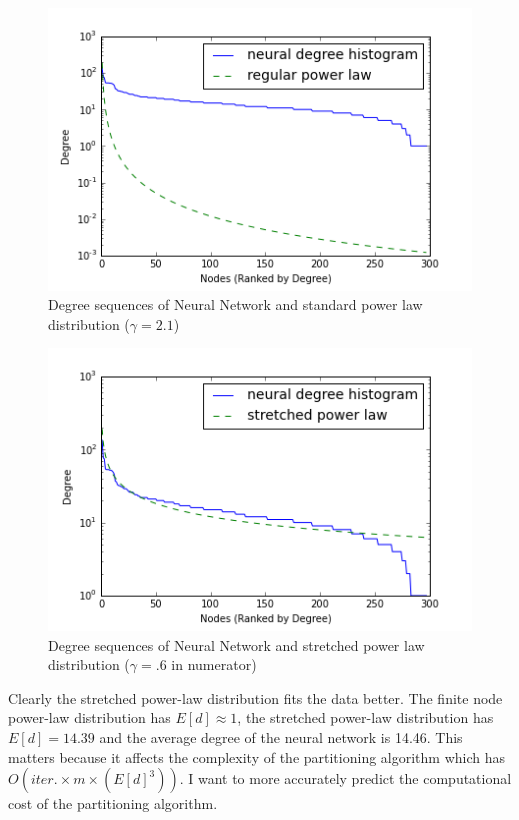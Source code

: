 \documentclass{article}
\begin{document}
\begin{figure}[H]
\centering
\includegraphics[width = \linewidth]{neuralsequenceplot2.png}
\caption{Degree sequences of Neural Network and standard power law distribution ($\gamma = 2.1$)}
\end{figure}

\begin{figure}[H]
\centering
\includegraphics[width = \linewidth]{neuralsequenceplot.png}
\caption{Degree sequences of Neural Network and stretched power law distribution ($\gamma = .6$ in numerator)}
\end{figure}

Clearly the stretched power-law distribution fits the data better. The finite node power-law distribution has $E[d] \approx 1$, the stretched power-law distribution has $E[d] = 14.39$ and the average degree of the neural network is 14.46. This matters because it affects the complexity of the partitioning algorithm which has $O(iter.\times m\times (E[d]^3))$. I want to more accurately predict the computational cost of the partitioning algorithm.
\end{document}
